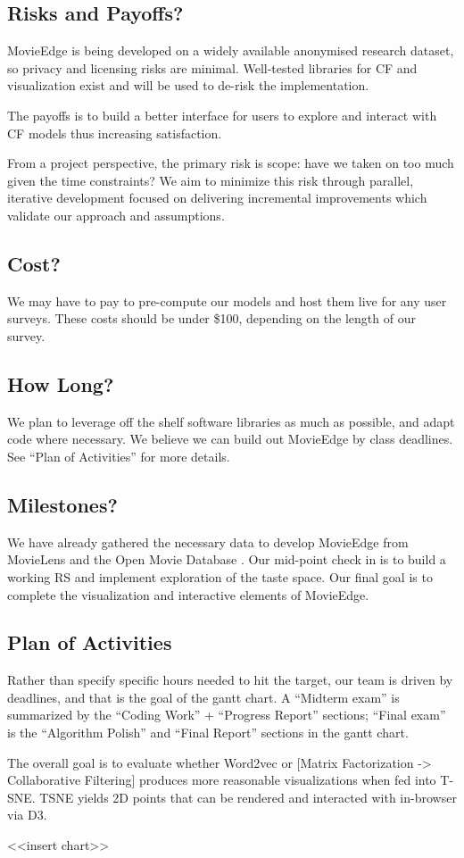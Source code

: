 \subsection{Risks and Payoffs?}

MovieEdge is being developed on a widely available anonymised research dataset, so privacy and licensing risks are minimal. Well-tested libraries for CF and visualization exist and will be used to de-risk the implementation. 

The payoffs is to build a better interface for users to explore and interact with CF models thus increasing satisfaction. 

From a project perspective, the primary risk is scope: have we taken on too much given the time constraints?   We aim to minimize this risk through parallel, iterative development focused on delivering incremental improvements which validate our approach and assumptions.

\subsection{Cost?}
We may have to pay to pre-compute our models and host them live for any user surveys. These costs should be under \$100, depending on the length of our survey.

\subsection{How Long?}
We plan to leverage off the shelf software libraries as much as possible, and adapt code where necessary. We believe we can build out MovieEdge by class deadlines. See “Plan of Activities” for more details.


\subsection{Milestones?}
We have already gathered the  necessary data to develop MovieEdge from MovieLens \cite{harper2016movielens} and the Open Movie Database \cite{openMovieDB}. Our mid-point check in is to build a working RS and implement exploration of the taste space. Our final goal is to complete the visualization and interactive elements of MovieEdge.

\subsection{Plan of Activities}

Rather than specify specific hours needed to hit the target, our team is driven by deadlines, and that is the goal of the gantt chart. A “Midterm exam” is summarized by the “Coding Work” + “Progress Report” sections; “Final exam” is the “Algorithm Polish” and “Final Report” sections in the gantt chart.

The overall goal is to evaluate whether Word2vec or [Matrix Factorization -> Collaborative 
Filtering] produces more reasonable visualizations when fed into T-SNE. TSNE yields 2D points that can be rendered and interacted with in-browser via D3.

<<insert chart>>


